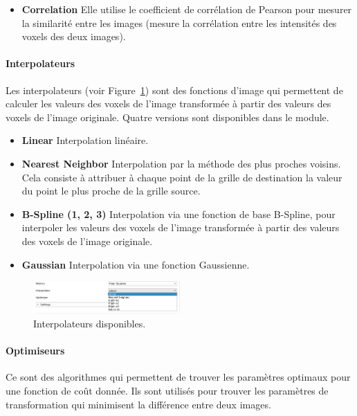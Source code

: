 \documentclass{article}
\newcommand{\subsubsubsection}[1]{\paragraph{#1}\par\noindent\bigskip}
\begin{document}
{{\begin{itemize}
            \item \textbf{Correlation} Elle utilise le coefficient de corrélation de Pearson pour mesurer la similarité entre les images (mesure la corrélation entre les intensités des voxels des deux images).
        \end{itemize}

        \bigskip
        \subsubsubsection{Interpolateurs}

        Les interpolateurs (voir Figure~\ref{fig:registration_interpolator}) sont des fonctions d'image qui permettent de calculer les valeurs des voxels de l'image transformée à partir des valeurs des voxels de l'image originale. Quatre versions sont disponibles dans le module.

        \begin{itemize}
            \item \textbf{Linear} Interpolation linéaire.

            \item \textbf{Nearest Neighbor} Interpolation par la méthode des plus proches voisins. Cela consiste à attribuer à chaque point de la grille de destination la valeur du point le plus proche de la grille source.

            \item \textbf{B-Spline (1, 2, 3)} Interpolation via une fonction de base B-Spline, pour interpoler les valeurs des voxels de l'image transformée à partir des valeurs des voxels de l'image originale.

            \item \textbf{Gaussian} Interpolation via une fonction Gaussienne.
        \end{itemize}

        \bigskip

        \begin{figure}[!ht]
            \centering
            \includegraphics[width=0.5\textwidth]{images/registration_interpolator.png}
            \caption{Interpolateurs disponibles.}
            \label{fig:registration_interpolator}
        \end{figure}

        \bigskip
        \subsubsubsection{Optimiseurs}

        Ce sont des algorithmes qui permettent de trouver les paramètres optimaux pour une fonction de coût donnée. Ils sont utilisés pour trouver les paramètres de transformation qui minimisent la différence entre deux images.

}}
\end{document}
